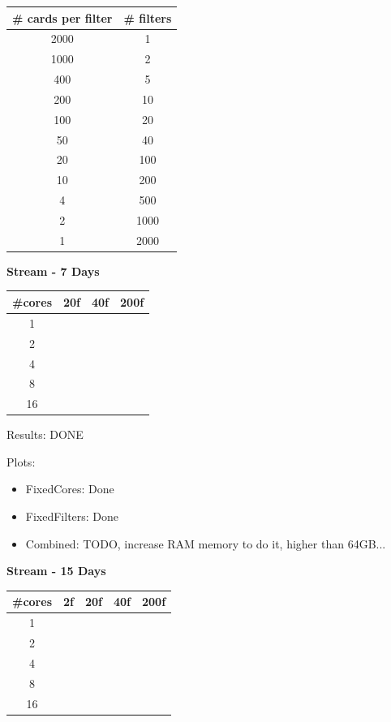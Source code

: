 \documentclass[12pt,a4paper]{article}
\begin{document}
\begin{table}[H]
    \renewcommand{\arraystretch}{1.5} %
    \centering
    \begin{tabular}{|c|c|}
    \hline
    \# cards per filter & \# filters \\ \hline
    2000   &   1     \\ \hline
    1000   &   2     \\ \hline
    400 &   5     \\ \hline
    200  &   10     \\ \hline
    100 &   20    \\ \hline
    50  &   40    \\ \hline
    20  &   100    \\ \hline
    10  &   200    \\ \hline
    4  &   500    \\ \hline
    2  &   1000    \\ \hline
    1  &   2000    \\ \hline
    \end{tabular}
\end{table}


\textbf{Stream - 7 Days}
\begin{table}[]
    \begin{tabular}{|c|c|c|c|}
    \hline
    \#cores & 20f & 40f & 200f \\ \hline
    1       &     &     &      \\ \hline
    2       &     &     &      \\ \hline
    4       &     &     &      \\ \hline
    8       &     &     &      \\ \hline
    16      &     &     &      \\ \hline
    \end{tabular}
\end{table}

Results: DONE

Plots:
\begin{itemize}
    \item FixedCores: Done
    \item FixedFilters: Done
    \item Combined: TODO, increase RAM memory to do it, higher than 64GB...
\end{itemize}


\textbf{Stream - 15 Days}
\begin{table}[]
    \begin{tabular}{|c|c|c|c|c|}
    \hline
    \#cores & 2f & 20f & 40f & 200f \\ \hline
    1       &    &     &     &      \\ \hline
    2       &    &     &     &      \\ \hline
    4       &    &     &     &      \\ \hline
    8       &    &     &     &      \\ \hline
    16      &    &     &     &      \\ \hline
    \end{tabular}
\end{table}
\end{document}
